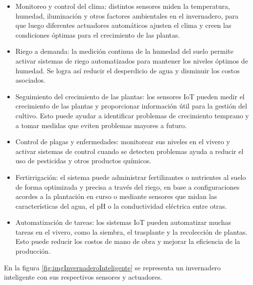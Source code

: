 \begin{itemize}
	\item Monitoreo y control del clima: distintos sensores miden la temperatura, humedad, iluminación y otros factores ambientales en el invernadero, para que luego diferentes actuadores automáticos ajusten el clima y creen las condiciones óptimas para el crecimiento de las plantas.

    \item Riego a demanda: la medición continua de la humedad del suelo permite activar sistemas de riego automatizados para mantener los niveles óptimos de humedad. Se logra así reducir el desperdicio de agua y disminuir los costos asociados.

    \item Seguimiento del crecimiento de las plantas: los sensores IoT pueden medir el crecimiento de las plantas y proporcionar información útil para la gestión del cultivo. Esto puede ayudar a identificar problemas de crecimiento temprano y a tomar medidas que eviten problemas mayores a futuro.

    \item Control de plagas y enfermedades: monitorear sus niveles en el vivero y activar sistemas de control cuando se detecten problemas ayuda a reducir el uso de pesticidas y otros productos químicos.
    
   \item  Fertirrigación: el sistema puede administrar fertilizantes o nutrientes al suelo de forma optimizada y precisa a través del riego, en base a configuraciones acordes a la plantación en curso o mediante sensores que midan las características del agua, el pH o la conductividad eléctrica entre otras.

    \item Automatización de tareas: los sistemas IoT pueden automatizar muchas tareas en el vivero, como la siembra, el trasplante y la recolección de plantas. Esto puede reducir los costos de mano de obra y mejorar la eficiencia de la producción.
\end{itemize}    

En la figura \ref{fig:imgInvernaderoInteligente} se representa un invernadero inteligente con sus respectivos sensores y actuadores.

